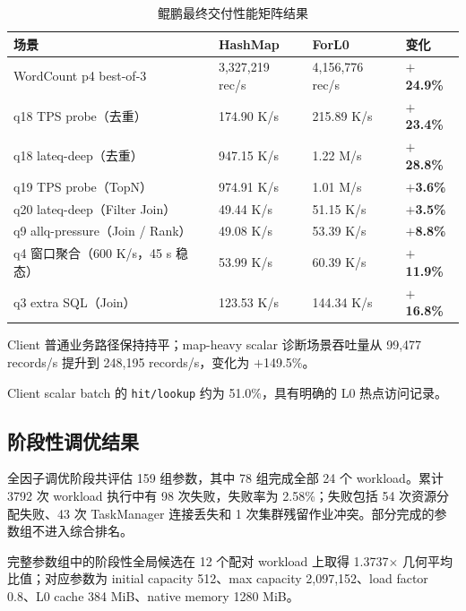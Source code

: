 \documentclass[a4paper,11pt]{article}
\begin{document}
\begin{table}[H]
\centering
\footnotesize
\setlength{\tabcolsep}{4pt}
\begin{tabularx}{\textwidth}{L{5.2cm} R{2.8cm} R{2.8cm} R{1.8cm}}
\toprule
\textbf{场景} & \textbf{HashMap} & \textbf{ForL0} & \textbf{变化} \\
\midrule
WordCount p4 best-of-3 & 3,327,219 rec/s & 4,156,776 rec/s & \textbf{$+$24.9\%} \\
q18 TPS probe（去重） & 174.90 K/s & 215.89 K/s & \textbf{$+$23.4\%} \\
q18 lateq-deep（去重） & 947.15 K/s & 1.22 M/s & \textbf{$+$28.8\%} \\
q19 TPS probe（TopN） & 974.91 K/s & 1.01 M/s & \textbf{$+$3.6\%} \\
q20 lateq-deep（Filter Join） & 49.44 K/s & 51.15 K/s & \textbf{$+$3.5\%} \\
q9 allq-pressure（Join / Rank） & 49.08 K/s & 53.39 K/s & \textbf{$+$8.8\%} \\
q4 窗口聚合（600 K/s，45 s 稳态） & 53.99 K/s & 60.39 K/s & \textbf{$+$11.9\%} \\
q3 extra SQL（Join） & 123.53 K/s & 144.34 K/s & \textbf{$+$16.8\%} \\
\bottomrule
\end{tabularx}
\caption{鲲鹏最终交付性能矩阵结果}
\end{table}

Client 普通业务路径保持持平；map-heavy scalar 诊断场景吞吐量从 99,477 records/s 提升到 248,195 records/s，变化为 $+$149.5\%。

Client scalar batch 的 \texttt{hit/lookup} 约为 51.0\%，具有明确的 L0 热点访问记录。

\subsection{阶段性调优结果}

全因子调优阶段共评估 159 组参数，其中 78 组完成全部 24 个 workload。累计 3792 次 workload 执行中有 98 次失败，失败率为 2.58\%；失败包括 54 次资源分配失败、43 次 TaskManager 连接丢失和 1 次集群残留作业冲突。部分完成的参数组不进入综合排名。

完整参数组中的阶段性全局候选在 12 个配对 workload 上取得 1.3737$\times$ 几何平均比值；对应参数为 initial capacity 512、max capacity 2,097,152、load factor 0.8、L0 cache 384 MiB、native memory 1280 MiB。
\end{document}
